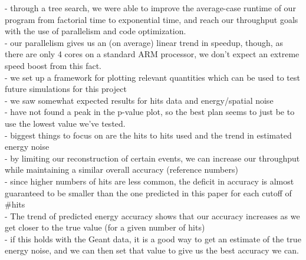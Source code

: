 - through a tree search, we were able to improve the average-case runtime of our program from factorial time to exponential time, and reach our throughput goals with the use of parallelism and code optimization.\\
- our parallelism gives us an (on average) linear trend in speedup, though, as there are only 4 cores on a standard ARM processor, we don't expect an extreme speed boost from this fact.\\
- we set up a framework for plotting relevant quantities which can be used to test future simulations for this project\\
- we saw somewhat expected results for hits data and energy/spatial noise\\
- have not found a peak in the p-value plot, so the best plan seems to just be to use the lowest value we've tested.\\
- biggest things to focus on are the hits to hits used and the trend in estimated energy noise\\
- by limiting our reconstruction of certain events, we can increase our throughput while maintaining a similar overall accuracy (reference numbers)\\
    - since higher numbers of hits are less common, the deficit in accuracy is almost guaranteed to be smaller than the one predicted in this paper for each cutoff of \#hits\\
- The trend of predicted energy accuracy shows that our accuracy increases as we get closer to the true value (for a given number of hits)\\
    - if this holds with the Geant data, it is a good way to get an estimate of the true energy noise, and we can then set that value to give us the best accuracy we can.\\